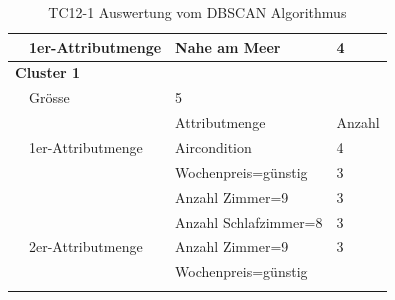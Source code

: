 \begin{longtable}{ | l | l | l | l |}
	& 1er-Attributmenge & \tabitem Nahe am Meer & 4 \\ \hline
		
	\multicolumn{4}{|l|}{\textbf{Cluster 1}} \\ \cline{2-4} 
	& Grösse & \multicolumn{2}{|l|}{5} \\ \cline{2-4} 
	&& Attributmenge & Anzahl \\ \cline{2-4} 
	
	& 1er-Attributmenge & \tabitem Aircondition & 4 \\ \cline{3-4} 
	& & \tabitem Wochenpreis=günstig & 3 \\ \cline{3-4} 
	& & \tabitem Anzahl Zimmer=9 & 3 \\ \cline{3-4} 
	& & \tabitem Anzahl Schlafzimmer=8 & 3 \\ \cline{2-4} 
	
	& 2er-Attributmenge & \tabitem Anzahl Zimmer=9 & 3 \\
	& & \tabitem Wochenpreis=günstig & \\ \hline

	\caption{TC12-1 Auswertung vom DBSCAN Algorithmus}
	\centering
	\label{fig:testingfazit:testing:testcases:12:1}
\end{longtable}
